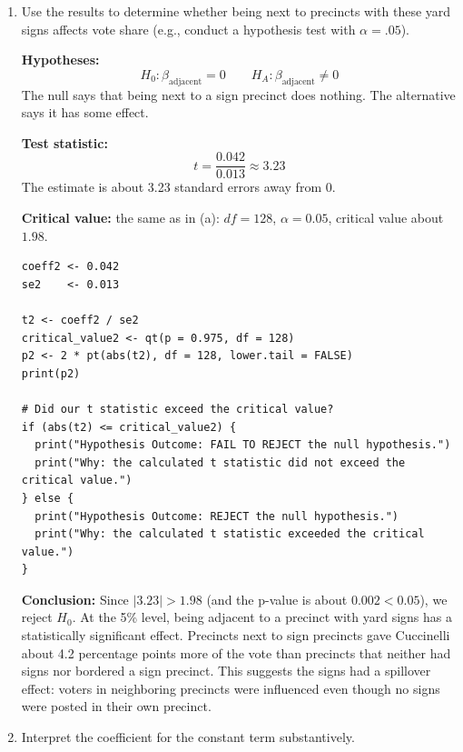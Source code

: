 \documentclass[12pt,letterpaper]{article}
\begin{document}
\begin{enumerate}
\newpage

\item [(b)]  Use the results to determine whether being next to precincts with these yard signs affects vote share (e.g., conduct a hypothesis test with $\alpha = .05$).

\vspace{.3cm}
\noindent\textbf{Hypotheses:}
\[
H_0: \beta_{\text{adjacent}} = 0 \qquad H_A: \beta_{\text{adjacent}} \neq 0
\]
The null says that being next to a sign precinct does nothing. The alternative says it has some effect.

\noindent\textbf{Test statistic:}
\[
t = \frac{0.042}{0.013} \approx 3.23
\]
The estimate is about 3.23 standard errors away from 0.

\noindent\textbf{Critical value:} the same as in (a): $df = 128$, $\alpha = 0.05$, critical value about $1.98$.

\begin{lstlisting}
coeff2 <- 0.042
se2    <- 0.013

t2 <- coeff2 / se2
critical_value2 <- qt(p = 0.975, df = 128)
p2 <- 2 * pt(abs(t2), df = 128, lower.tail = FALSE)
print(p2)

# Did our t statistic exceed the critical value?
if (abs(t2) <= critical_value2) {
  print("Hypothesis Outcome: FAIL TO REJECT the null hypothesis.")
  print("Why: the calculated t statistic did not exceed the critical value.")
} else {
  print("Hypothesis Outcome: REJECT the null hypothesis.")
  print("Why: the calculated t statistic exceeded the critical value.")
}
\end{lstlisting}

\noindent\textbf{Conclusion:} Since $|3.23| > 1.98$ (and the p-value is about $0.002 < 0.05$), we reject $H_0$. At the 5\% level, being adjacent to a precinct with yard signs has a statistically significant effect. Precincts next to sign precincts gave Cuccinelli about 4.2 percentage points more of the vote than precincts that neither had signs nor bordered a sign precinct. This suggests the signs had a spillover effect: voters in neighboring precincts were influenced even though no signs were posted in their own precinct.

\newpage

\item [(c)] Interpret the coefficient for the constant term substantively.


\end{enumerate}
\end{document}
